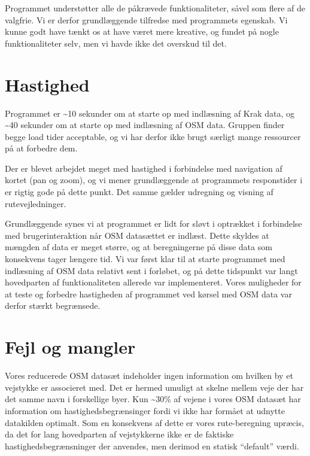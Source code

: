 Programmet understøtter alle de påkrævede funktionaliteter, såvel som flere af de valgfrie. Vi er derfor grundlæggende tilfredse med programmets egenskab. Vi kunne godt have tænkt os at have været mere kreative, og fundet på nogle funktionaliteter selv, men vi havde ikke det overskud til det.

\section{Hastighed}
\label{sec:hastighed}

Programmet er \textasciitilde10 sekunder om at starte op med indlæsning af Krak data, og \textasciitilde40 sekunder om at starte op med indlæsning af OSM data. Gruppen finder begge load tider acceptable, og vi har derfor ikke brugt særligt mange ressourcer på at forbedre dem.

Der er blevet arbejdet meget med hastighed i forbindelse med navigation af kortet (pan og zoom), og vi mener grundlæggende at programmets responstider i er rigtig gode på dette punkt. Det samme gælder udregning og visning af rutevejledninger.

Grundlæggende synes vi at programmet er lidt for sløvt i optrækket i forbindelse med brugerinteraktion når OSM datasættet er indlæst. Dette skyldes at mængden af data er meget større, og at beregningerne på disse data som konsekvens tager længere tid. Vi var først klar til at starte programmet med indlæsning af OSM data relativt sent i forløbet, og på dette tidspunkt var langt hovedparten af funktionaliteten allerede var implementeret. Vores muligheder for at teste og forbedre hastigheden af programmet ved kørsel med OSM data var derfor stærkt begrænsede.

\section{Fejl og mangler}
\label{sec:fejlOgMangler}

Vores reducerede OSM datasæt indeholder ingen information om hvilken by et vejstykke er associeret med. Det er hermed umuligt at skelne mellem veje der har det samme navn i forskellige byer. Kun \textasciitilde30\% af vejene i vores OSM datasæt har information om hastighedsbegrænsinger fordi vi ikke har formået at udnytte datakilden optimalt. Som en konsekvens af dette er vores rute-beregning upræcis, da det for lang hovedparten af vejstykkerne ikke er de faktiske hastighedsbegrænsninger der anvendes, men derimod en statisk ``default'' værdi.

